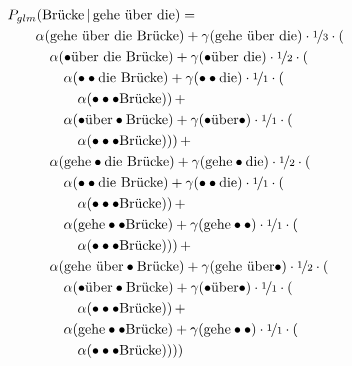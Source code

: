 \documentclass[11pt,a4paper]{article}
\newcommand\givenbase[1][]{\,#1\lvert\,}
\let\given\givenbase
\newcommand{\probSymbol}[1][]{P_{#1}}
\newcommand{\prob}[2][]{\probSymbol[#1](#2)}
\newcommand{\probCond}[3][]{\prob[#1]{#2 \given #3}}
\begin{document}
\begin{equation}
  \begin{split}
    &\hspace{-2em}\probCond[glm]{\text{Br\"ucke}}{\text{gehe \"uber die}} = \\
      &\alpha(\text{gehe \"uber die Br\"ucke}) + \gamma(\text{gehe \"uber die}) \cdot \nicefrac{1}{3} \cdot (\\
        &\quad\alpha(\bullet\text{\"uber die Br\"ucke}) + \gamma(\bullet\text{\"uber die}) \cdot \nicefrac{1}{2} \cdot (\\
          &\quad\quad\alpha(\bullet\bullet\text{die Br\"ucke}) + \gamma(\bullet\bullet\text{die}) \cdot \nicefrac{1}{1} \cdot (\\
            &\quad\quad\quad\alpha(\bullet\bullet\bullet\text{Br\"ucke})) \, + \\
          &\quad\quad\alpha(\bullet\text{\"uber}\bullet\text{Br\"ucke}) + \gamma(\bullet\text{\"uber}\bullet) \cdot \nicefrac{1}{1} \cdot (\\
            &\quad\quad\quad\alpha(\bullet\bullet\bullet\text{Br\"ucke}))) \, + \\
        &\quad\alpha(\text{gehe}\bullet\text{die Br\"ucke}) + \gamma(\text{gehe}\bullet\text{die}) \cdot \nicefrac{1}{2} \cdot ( \\
          &\quad\quad\alpha(\bullet\bullet\text{die Br\"ucke}) + \gamma(\bullet\bullet\text{die}) \cdot \nicefrac{1}{1} \cdot (\\
            &\quad\quad\quad\alpha(\bullet\bullet\bullet\text{Br\"ucke})) \, + \\
          &\quad\quad\alpha(\text{gehe}\bullet\bullet\text{Br\"ucke}) + \gamma(\text{gehe}\bullet\bullet) \cdot \nicefrac{1}{1} \cdot (\\
            &\quad\quad\quad\alpha(\bullet\bullet\bullet\text{Br\"ucke}))) \, + \\
        &\quad\alpha(\text{gehe \"uber}\bullet\text{Br\"ucke}) + \gamma(\text{gehe \"uber}\bullet) \cdot \nicefrac{1}{2} \cdot (\\
          &\quad\quad\alpha(\bullet\text{\"uber}\bullet\text{Br\"ucke}) + \gamma(\bullet\text{\"uber}\bullet) \cdot \nicefrac{1}{1} \cdot (\\
            &\quad\quad\quad\alpha(\bullet\bullet\bullet\text{Br\"ucke})) \, + \\
          &\quad\quad\alpha(\text{gehe}\bullet\bullet\text{Br\"ucke}) + \gamma(\text{gehe}\bullet\bullet) \cdot \nicefrac{1}{1} \cdot (\\
            &\quad\quad\quad\alpha(\bullet\bullet\bullet\text{Br\"ucke}))))
  \end{split}
\end{equation}
\end{document}

